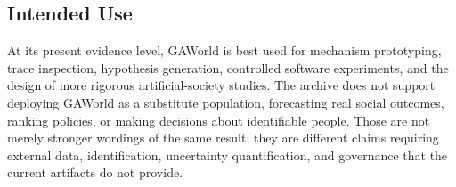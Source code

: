\subsection{Intended Use}

At its present evidence level, GAWorld is best used for mechanism prototyping,
trace inspection, hypothesis generation, controlled software experiments, and
the design of more rigorous artificial-society studies.  The archive does not
support deploying GAWorld as a substitute population, forecasting real social
outcomes, ranking policies, or making decisions about identifiable people.
Those are not merely stronger wordings of the same result; they are different
claims requiring external data, identification, uncertainty quantification,
and governance that the current artifacts do not provide.
